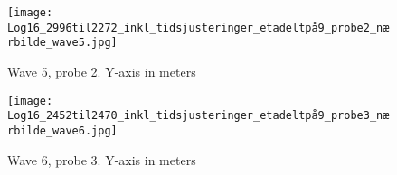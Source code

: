 \begin{figure}[ht]
    \centering
    \texttt{[image: Log16\_2996til2272\_inkl\_tidsjusteringer\_etadeltpå9\_probe2\_nærbilde\_wave5.jpg]}
    \caption{Wave 5, probe 2. Y-axis in meters}
    \label{fig:}
\end{figure}
\begin{figure}[ht]
    \centering
    \texttt{[image: Log16\_2452til2470\_inkl\_tidsjusteringer\_etadeltpå9\_probe3\_nærbilde\_wave6.jpg]}
    \caption{Wave 6, probe 3. Y-axis in meters}
    \label{fig:}
\end{figure}


\begin{comment}
d
\end{comment}




